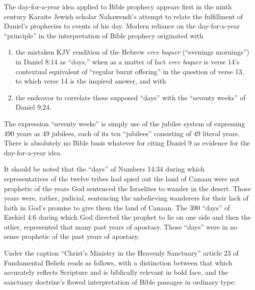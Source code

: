 The day-for-a-year idea applied to Bible prophecy appears first in the ninth
century Karaite Jewish scholar Nahawendi's attempt to relate the fulfillment
of Daniel's prophecies to events of his day. Modern reliance on the
day-for-a-year ``principle'' in the interpretation of Bible prophecy
originated with
\begin{enumerate}
	\item the mistaken KJV rendition of the Hebrew \textit{erev boquer}
(``evenings mornings'') in Daniel 8:14 as ``days,'' when as a matter of fact 
\textit{erev boquer} is verse 14's contextual equivalent of ``regular burnt offering''
in the question of verse 13, to which verse 14 is the inspired answer, and
with 
	\item the endeavor to correlate these supposed ``days'' with the ``seventy
weeks'' of Daniel 9:24.
\end{enumerate}
The expression ``seventy weeks'' is simply use of the
jubilee system of expressing 490 years as 49 jubilees, each of its ten
``jubilees'' consisting of 49 literal years. There is absolutely no Bible
basis whatever for citing Daniel 9 as evidence for the day-for-a-year idea.

It should be noted that the ``days'' of Numbers 14:34 during which
representatives of the twelve tribes had spied out the land of Canaan were
not prophetic of the years God sentenced the Israelites to wander in the
desert. Those years were, rather, judicial, sentencing the unbelieving
wanderers for their lack of faith in God's promise to give them the land of
Canaan. The 390 ``days'' of Ezekiel 4:6 during which God directed the prophet
to lie on one side and then the other, represented that many past years of
apostasy. Those ``days'' were in no sense prophetic of the past years of
apostasy.

Under the caption ``Christ's Ministry in the Heavenly Sanctuary'' article 23
of Fundamental Beliefs reads as follows, with a distinction between that
which accurately reflects Scripture and is biblically relevant in bold face,
and the sanctuary doctrine's flawed interpretation of Bible passages in
ordinary type:

